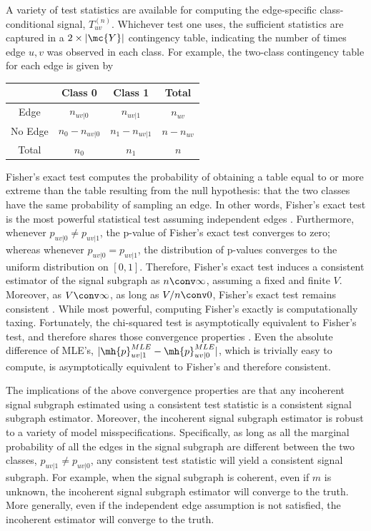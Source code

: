 \documentclass[10pt,journal,cspaper,compsoc]{IEEEtran}
\begin{document}
A variety of test statistics are available for computing the edge-specific class-conditional signal, $T_{uv}^{(n)}$. Whichever test one uses, the sufficient statistics are captured in a $2 \times |\mc{Y}|$  contingency table, indicating the number of times edge $u,v$ was observed in each class.  For example, the two-class contingency table for each edge is given by

\begin{table}[h!]
\begin{center}
\begin{tabular}{c||c|c||c}
 & Class 0  & Class 1 & Total \\
\hline\hline
Edge & $n_{uv|0}$ & $n_{uv|1}$ & $n_{uv}$ \\ \hline
No Edge & $n_0-n_{uv|0}$ & $n_1-n_{uv|1}$ & $n-n_{uv}$ \\ \hline \hline
Total & $n_0$ & $n_1$ & $n$\\
\end{tabular}
\end{center}
\label{tab:fwpath}
\end{table}%

Fisher's exact test computes the probability of obtaining a table equal to or more extreme than the table resulting from the null hypothesis: that the two classes have the same probability of sampling an edge.  In other words, Fisher's exact test is the most powerful statistical test assuming independent edges \cite{Rice1995}.  Furthermore, whenever $p_{uv|0}\neq p_{uv|1}$, the p-value of Fisher's exact test converges to zero; whereas whenever $p_{uv|0}=p_{uv|1}$, the distribution of p-values converges to the uniform distribution on $[0,1]$.  Therefore, Fisher's exact test induces a consistent estimator of the signal subgraph as $n \conv \infty$, assuming a fixed and finite $V$.  Moreover, as $V \conv \infty$, as long as $V/n \conv 0$, Fisher's exact test remains consistent \cite{Rice1995}.  While most powerful, computing Fisher's exactly is computationally taxing.  Fortunately, the chi-squared test is asymptotically equivalent to Fisher's test, and therefore shares those convergence properties \cite{Rice1995}.  Even the absolute difference of MLE's, $|\mh{p}_{uv|1}^{MLE}-\mh{p}_{uv|0}^{MLE}|$, which is trivially easy to compute, is asymptotically equivalent to Fisher's \cite{Rice1995} and therefore consistent.

The implications of the above convergence properties are that any incoherent signal subgraph estimated using a consistent test statistic is a consistent signal subgraph estimator.  Moreover, the incoherent signal subgraph estimator is robust to a variety of model misspecifications.  Specifically, as long as all the marginal probability of all the edges in the signal subgraph are different between the two classes, $p_{uv|1}\neq p_{uv|0}$, any consistent test statistic will yield a consistent signal subgraph.  For example, when the signal subgraph is coherent, even if $m$ is unknown, the incoherent signal subgraph estimator will converge to the truth.  More generally, even if the independent edge assumption is not satisfied, the incoherent estimator will converge to the truth.
\end{document}
